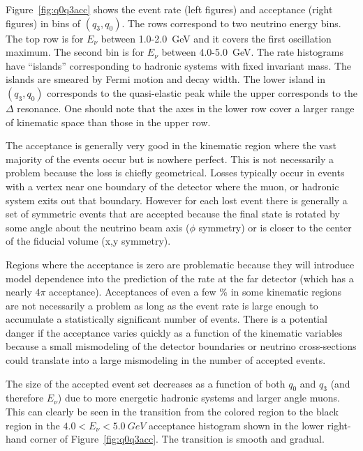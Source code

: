 Figure~\ref{fig:q0q3acc} shows the event rate (left figures) and acceptance (right figures) in bins of $(q_3,q_0)$. The rows correspond to two neutrino energy bins. The top row is for $E_\nu$ between \num{1.0}-\SI{2.0}{GeV} and it covers the first oscillation maximum. The second bin is for $E_\nu$ between \num{4.0}-\SI{5.0}{GeV}.  The rate histograms have ``islands''  corresponding to hadronic systems with fixed invariant mass. The islands are smeared by Fermi motion and decay width. The lower island in $(q_3,q_0)$ corresponds to the quasi-elastic peak while the upper corresponds to the $\Delta$ resonance. One should note that the axes in the lower row cover a larger range of kinematic space than those in the upper row. 

The acceptance is generally very good in the kinematic region where the vast majority of the events occur but is nowhere perfect. This is not necessarily a problem because the loss is chiefly geometrical. Losses typically occur in events with a vertex near one boundary of the detector where the muon, or hadronic system exits out that boundary.  However for each lost event there is generally a set of symmetric events that are accepted because the final state is rotated by some angle about the neutrino beam axis ($\phi$ symmetry) or is closer to the center of the fiducial volume (x,y symmetry).

Regions where the acceptance is zero are problematic because they will introduce model dependence into the prediction of the rate at the far detector (which has a nearly $4\pi$ acceptance). Acceptances of even a few \% in some kinematic regions are not necessarily a problem as long as the event rate is large enough to accumulate a statistically significant number of events. %
There is a potential danger if the acceptance varies quickly as a function of the kinematic variables because a small mismodeling of the detector boundaries or neutrino cross-sections could translate into a large mismodeling in the number of accepted events. 

The size of the accepted event set decreases as a function of both $q_0$ and $q_3$ (and therefore $E_\nu$) due to more energetic hadronic systems and larger angle muons. This can clearly be seen in the transition from the colored region to the black region in the $\num{4.0} < E_\nu < \SI{5.0}{GeV}$ acceptance histogram shown in the lower right-hand corner of Figure~\ref{fig:q0q3acc}. The transition is smooth and gradual. %

